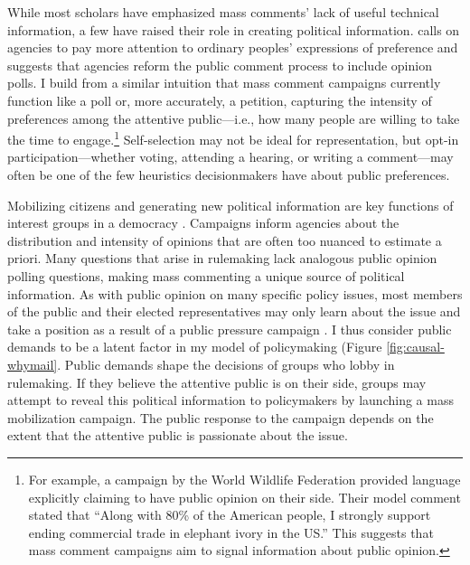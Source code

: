 \documentclass[
      12pt,
        ]{article}
\begin{document}
While most scholars have emphasized mass comments' lack of useful
technical information, a few have raised their role in creating
political information. \citet{Cuellar2005} calls on agencies to pay more
attention to ordinary peoples' expressions of preference and \citet{Rauch2016}
suggests that agencies reform the public comment process to include
opinion polls. I build from a similar intuition that mass comment
campaigns currently function like a poll or, more accurately, a
petition, capturing the intensity of preferences among the attentive
public---i.e., how many people are willing to take the time to
engage.\footnote{For example, a campaign by the World Wildlife Federation provided
  language explicitly claiming to have public opinion on their side.
  Their model comment stated that ``Along with 80\% of the American
  people, I strongly support ending commercial trade in elephant ivory
  in the US.'' This suggests that mass comment campaigns aim to signal
  information about public opinion.} Self-selection may not be ideal for representation, but
opt-in participation---whether voting, attending a hearing, or writing a
comment---may often be one of the few heuristics decisionmakers have
about public preferences.

Mobilizing citizens and generating new political information are key
functions of interest groups in a democracy
\citep{Mansbridge1992, Mahoney2007}. Campaigns inform agencies about the
distribution and intensity of opinions that are often too nuanced to
estimate a priori. Many questions that arise in rulemaking lack
analogous public opinion polling questions, making mass commenting a
unique source of political information. As with public opinion on many
specific policy issues, most members of the public and their elected
representatives may only learn about the issue and take a position as a
result of a public pressure campaign \citep{Hutchings2003}. I thus consider
public demands to be a latent factor in my model of policymaking (Figure
\ref{fig:causal-whymail}. Public demands shape the decisions of
groups who lobby in rulemaking. If they believe the attentive public is
on their side, groups may attempt to reveal this political information
to policymakers by launching a mass mobilization campaign. The public
response to the campaign depends on the extent that the attentive public
is passionate about the issue.
\end{document}
